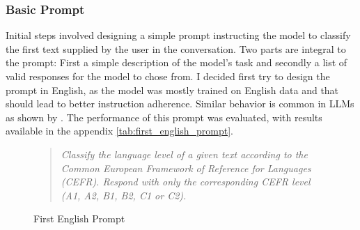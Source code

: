 \subsubsection*{Basic Prompt}
\label{sss:basic_prompt}
Initial steps involved designing a simple prompt instructing the model to classify the first text supplied by the user in the conversation. Two parts are integral to the prompt: First a simple description of the model's task and secondly a list of valid responses for the model to chose from. I decided first try to design the prompt in English, as the model was mostly trained on English data \citep{LLaMA3} and that should lead to better instruction adherence. Similar behavior is common in LLMs as shown by \cite{Siddhant2020}. The performance of this prompt was evaluated, with results available in the appendix \ref{tab:first_english_prompt}.
\captionsetup{labelformat=prompt}
\begin{figure}[h]
    \begin{quotation}
        \textit{Classify the language level of a given text according to the Common European Framework of Reference for Languages (CEFR). Respond with only the corresponding CEFR level (A1, A2, B1, B2, C1 or C2).}
    \end{quotation}
    \caption{First English Prompt}
    \label{qu:first_english_prompt}
\end{figure}
\captionsetup{labelformat=default}

